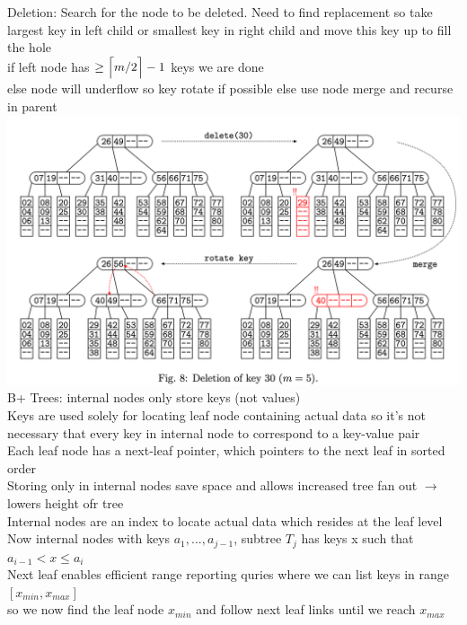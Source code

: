 \documentclass{article}
\DeclarePairedDelimiter{\ceil}{\lceil}{\rceil}
\begin{document}
  Deletion: Search for the node to be deleted. Need to find replacement so take largest key in left child or smallest key in right child and move this key up to fill the hole\\
  \indent if left node has $\geq \ceil[\Big]{m/2} - 1$ keys we are done\\
  \indent else node will underflow so key rotate if possible else use node merge and recurse in parent\\
  \includegraphics[width=\textwidth]{BTreeDeletion}
  B+ Trees: internal nodes only store keys (not values)\\
  Keys are used solely for locating leaf node containing actual data so it's not necessary that every key in internal node to correspond to a key-value pair\\
  Each leaf node has a next-leaf pointer, which pointers to the next leaf in sorted order \\
  Storing only in internal nodes save space and allows increased tree fan out $\rightarrow$ lowers height ofr tree\\
  Internal nodes are an index to locate actual data which resides at the leaf level\\
  Now internal nodes with keys $a_{1}, ..., a_{j-1}$, subtree $T_{j}$ has keys x such that $a_{i-1} < x \leq a_{i}$\\
  Next leaf enables efficient range reporting quries where we can list keys in range $[x_{min}, x_{max}]$\\
  \indent so we now find the leaf node $x_{min}$ and follow next leaf links until we reach $x_{max}$\\
\end{document}
